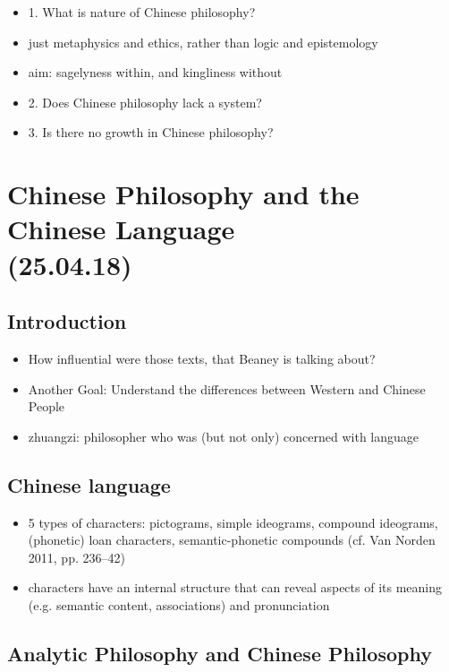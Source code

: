 \documentclass[emulatestandardclasses]{scrartcl}
\begin{document}
\begin{itemize}
  \item 1. What is nature of Chinese philosophy?
  \item just metaphysics and ethics, rather than logic and epistemology
  \item aim: sagelyness within, and kingliness without
  \item 2. Does Chinese philosophy lack a system?
  \item 3. Is there no growth in Chinese philosophy?
\end{itemize}


\section{Chinese Philosophy and the Chinese Language\\(25.04.18)}

\subsection{Introduction}

\begin{itemize}
  \item How influential were those texts, that Beaney is talking about?
  \item Another Goal: Understand the differences between Western and Chinese People
  \item zhuangzi: philosopher who was (but not only) concerned with language
\end{itemize}

\subsection{Chinese language}

\begin{itemize}
  \item 5 types of characters: pictograms, simple ideograms, compound ideograms, (phonetic) loan characters, semantic-phonetic compounds (cf. Van Norden 2011, pp. 236–42)
  \item characters have an internal structure that can reveal aspects of its meaning (e.g. semantic content, associations) and pronunciation
\end{itemize}


\subsection{Analytic Philosophy and Chinese Philosophy}
\end{document}
